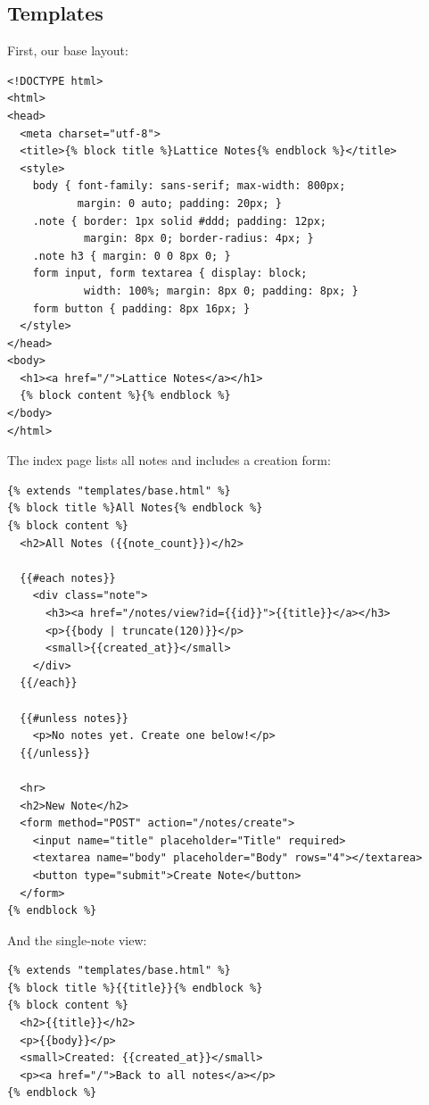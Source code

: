 \subsection{Templates}\label{sec:webapp-templates}

First, our base layout:

\begin{lstlisting}[language={}, caption={templates/base.html}]
<!DOCTYPE html>
<html>
<head>
  <meta charset="utf-8">
  <title>{% block title %}Lattice Notes{% endblock %}</title>
  <style>
    body { font-family: sans-serif; max-width: 800px;
           margin: 0 auto; padding: 20px; }
    .note { border: 1px solid #ddd; padding: 12px;
            margin: 8px 0; border-radius: 4px; }
    .note h3 { margin: 0 0 8px 0; }
    form input, form textarea { display: block;
            width: 100%; margin: 8px 0; padding: 8px; }
    form button { padding: 8px 16px; }
  </style>
</head>
<body>
  <h1><a href="/">Lattice Notes</a></h1>
  {% block content %}{% endblock %}
</body>
</html>
\end{lstlisting}

The index page lists all notes and includes a creation form:

\begin{lstlisting}[language={}, caption={templates/index.html}]
{% extends "templates/base.html" %}
{% block title %}All Notes{% endblock %}
{% block content %}
  <h2>All Notes ({{note_count}})</h2>

  {{#each notes}}
    <div class="note">
      <h3><a href="/notes/view?id={{id}}">{{title}}</a></h3>
      <p>{{body | truncate(120)}}</p>
      <small>{{created_at}}</small>
    </div>
  {{/each}}

  {{#unless notes}}
    <p>No notes yet. Create one below!</p>
  {{/unless}}

  <hr>
  <h2>New Note</h2>
  <form method="POST" action="/notes/create">
    <input name="title" placeholder="Title" required>
    <textarea name="body" placeholder="Body" rows="4"></textarea>
    <button type="submit">Create Note</button>
  </form>
{% endblock %}
\end{lstlisting}

And the single-note view:

\begin{lstlisting}[language={}, caption={templates/note.html}]
{% extends "templates/base.html" %}
{% block title %}{{title}}{% endblock %}
{% block content %}
  <h2>{{title}}</h2>
  <p>{{body}}</p>
  <small>Created: {{created_at}}</small>
  <p><a href="/">Back to all notes</a></p>
{% endblock %}
\end{lstlisting}


